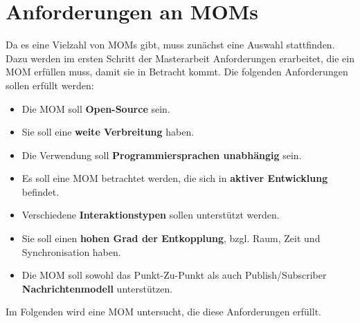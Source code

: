 \section{Anforderungen an MOMs}
\label{sec:anforderungenMom}
Da es eine Vielzahl von MOMs gibt, muss zunächst eine Auswahl stattfinden. Dazu werden im ersten Schritt der Masterarbeit Anforderungen erarbeitet, die ein MOM erfüllen muss, damit sie in Betracht kommt. Die folgenden Anforderungen sollen erfüllt werden:
\begin{itemize}
\item Die MOM soll \textbf{Open-Source} sein.
\item Sie soll eine \textbf{weite Verbreitung} haben.
\item Die Verwendung soll \textbf{Programmiersprachen unabhängig} sein.
\item Es soll eine MOM betrachtet werden, die sich in \textbf{aktiver Entwicklung} befindet.
\item Verschiedene \textbf{Interaktionstypen} sollen unterstützt werden.
\item Sie soll einen \textbf{hohen Grad der Entkopplung}, bzgl. Raum, Zeit und Synchronisation haben.
\item Die MOM soll sowohl das Punkt-Zu-Punkt als auch Publish/Subscriber \textbf{Nachrichtenmodell} unterstützen.
\end{itemize}

Im Folgenden wird eine MOM untersucht, die diese Anforderungen erfüllt.

